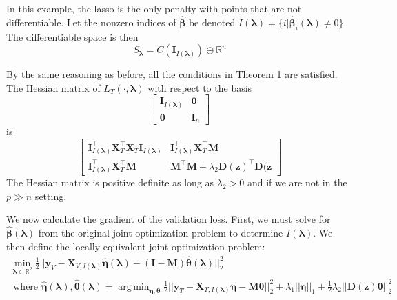 \documentclass[10pt,letterpaper]{article}
\DeclareMathOperator*{\argmin}{arg\,min}
\begin{document}
In this example, the lasso is the only penalty with points that are not differentiable. Let the nonzero indices of $\hat{\boldsymbol{\beta}}$ be denoted $I(\boldsymbol\lambda) = \{i | \hat{\boldsymbol{\beta}}_i(\boldsymbol\lambda) \ne 0\}$. The differentiable space is then
\begin{equation}
S_{\boldsymbol{\lambda}} = C(\boldsymbol I_{I(\boldsymbol\lambda)}) \oplus \mathbb{R}^n
\end{equation}

By the same reasoning as before, all the conditions in Theorem 1 are satisfied. The Hessian matrix of $L_T(\cdot, \boldsymbol{\lambda})$ with respect to the basis 
\begin{equation}
\begin{bmatrix}
\boldsymbol I_{I(\boldsymbol\lambda)} & \boldsymbol 0\\
\boldsymbol 0 & \boldsymbol I_n
\end{bmatrix}
\end{equation}
is
\begin{equation}
\begin{bmatrix}
\boldsymbol I_{I(\boldsymbol \lambda)}^\top \boldsymbol X_T^\top \boldsymbol X_T \boldsymbol I_{I(\boldsymbol \lambda)} &  \boldsymbol I_{I(\boldsymbol \lambda)}^\top \boldsymbol X_T^\top \boldsymbol M \\
\boldsymbol I_{I(\boldsymbol \lambda)}^\top \boldsymbol X_T^\top \boldsymbol M & \boldsymbol{M}^\top \boldsymbol{M}
+ \lambda_2 \boldsymbol{D}(\boldsymbol{z})^\top \boldsymbol{D}(\boldsymbol{z}
\end{bmatrix}
\end{equation}
The Hessian matrix is positive definite as long as $\lambda_2 > 0$ and if we are not in the $p \gg n$ setting.

We now calculate the gradient of the validation loss. First, we must solve for $\hat{\boldsymbol{\beta}}(\boldsymbol{\lambda})$ from the original joint optimization problem to determine $I(\boldsymbol \lambda)$. We then define the locally equivalent joint optimization problem:
\begin{equation}
\begin{array}{c}
\min_{\boldsymbol\lambda \in \mathbb{R}^2} \frac{1}{2}
\bigl\lvert\bigl\lvert
\boldsymbol{y}_V
- \boldsymbol{X}_{V, I(\boldsymbol \lambda)} \hat{\boldsymbol{\eta}}(\boldsymbol{\lambda})
- (\boldsymbol{I} - \boldsymbol{M}) \hat{\boldsymbol{\theta}}(\boldsymbol{\lambda})
\bigl\rvert\bigl\rvert^2_2 \\
\text{ where }
\hat{\boldsymbol{\eta}}(\boldsymbol{\lambda}),
\hat{\boldsymbol{\theta}}(\boldsymbol{\lambda}) =
\argmin_{\boldsymbol \eta, \boldsymbol{\theta}}
\frac{1}{2} \bigl\lvert\bigl\lvert
\boldsymbol{y}_T
- \boldsymbol{X}_{T, I(\boldsymbol \lambda)}\boldsymbol{\eta}
- \boldsymbol{M} \boldsymbol{\theta} \bigl\rvert\bigl\rvert^2_2
+ \lambda_1 \lvert\lvert \boldsymbol{\eta} \rvert \rvert_1
+ \frac{1}{2} \lambda_2 \lvert\lvert \boldsymbol{D}(\boldsymbol{z}) \boldsymbol{\theta} \rvert \rvert_2^2
\end{array}
\label{aplmRestricted}
\end{equation}
\end{document}
